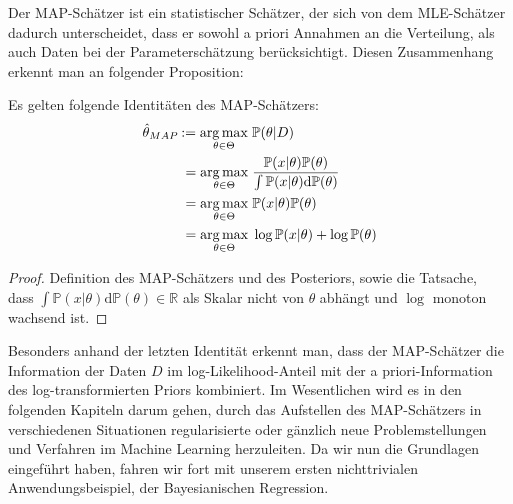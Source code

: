Der MAP-Schätzer ist ein statistischer Schätzer, der sich von dem MLE-Schätzer dadurch unterscheidet, dass er sowohl a priori Annahmen an die Verteilung, als auch Daten bei der Parameterschätzung berücksichtigt. Diesen Zusammenhang erkennt man an folgender Proposition:\vspace*{0,3cm}
\begin{propo}
	Es gelten folgende Identitäten des MAP-Schätzers:
	\begin{align*}
	\hat{\theta}_{MAP}\: &\hspace{-3pt}:= \underset{\theta\in \Theta}{\arg \max}														\hspace{0.1cm} \mathbb{P}(\theta \vert D) \\
						&= \underset{\theta \in \Theta}{\arg\max}\hspace{0.1cm} \frac{ 									\mathbb{P}(x\vert\theta) \mathbb{P}(\theta)}{\int  											\mathbb{P}(x\vert \theta)\text{d}\mathbb{P}(\theta)} \\
 						&= \underset{\theta \in \Theta}{\arg\max}\hspace{0.1cm}  										\mathbb{P}(x\vert \theta) \mathbb{P}(\theta) \\
					 	&= \underset{\theta \in \Theta}{\arg\max}\hspace{0.1cm} \log									\mathbb{P}(x\vert \theta) + \log \mathbb{P}(\theta)
	\end{align*}
	\label{prop:map}
\end{propo}

\begin{proof}
Definition des MAP-Schätzers und des Posteriors, sowie die Tatsache, \\ dass $\int  \mathbb{P}(x\vert \theta) \text{d}\mathbb{P}(\theta) \in \mathbb{R}$ als Skalar nicht von $\theta$ abhängt und $\log$ monoton wachsend ist.
\end{proof}

Besonders anhand der letzten Identität erkennt man, dass der MAP-Schätzer die Information der Daten $D$ im log-Likelihood-Anteil mit der a priori-Information des log-transformierten Priors kombiniert. Im Wesentlichen wird es in den folgenden Kapiteln darum gehen, durch das Aufstellen des MAP-Schätzers in verschiedenen Situationen regularisierte oder gänzlich neue Problemstellungen und Verfahren im Machine Learning herzuleiten. Da wir nun die Grundlagen eingeführt haben, fahren wir fort mit unserem ersten nichttrivialen Anwendungsbeispiel, der Bayesianischen Regression.



